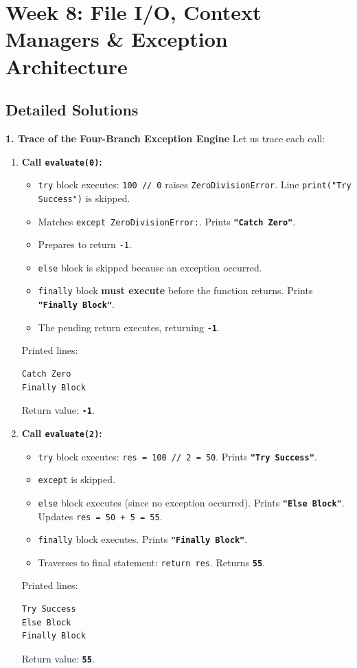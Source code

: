 \section*{Week 8: File I/O, Context Managers \& Exception Architecture}

\subsection*{Detailed Solutions}

\textbf{1. Trace of the Four-Branch Exception Engine}
Let us trace each call:
\begin{enumerate}
    \item \textbf{Call \texttt{evaluate(0)}:}
    \begin{itemize}
        \item \texttt{try} block executes: \texttt{100 // 0} raises \texttt{ZeroDivisionError}. Line \texttt{print("Try Success")} is skipped.
        \item Matches \texttt{except ZeroDivisionError:}. Prints \textbf{\texttt{"Catch Zero"}}.
        \item Prepares to return \texttt{-1}.
        \item \texttt{else} block is skipped because an exception occurred.
        \item \texttt{finally} block \textbf{must execute} before the function returns. Prints \textbf{\texttt{"Finally Block"}}.
        \item The pending return executes, returning \textbf{\texttt{-1}}.
    \end{itemize}
    Printed lines:
    \begin{lstlisting}
Catch Zero
Finally Block
    \end{lstlisting}
    Return value: \textbf{\texttt{-1}}.

    \item \textbf{Call \texttt{evaluate(2)}:}
    \begin{itemize}
        \item \texttt{try} block executes: \texttt{res = 100 // 2 = 50}. Prints \textbf{\texttt{"Try Success"}}.
        \item \texttt{except} is skipped.
        \item \texttt{else} block executes (since no exception occurred). Prints \textbf{\texttt{"Else Block"}}. Updates \texttt{res = 50 + 5 = 55}.
        \item \texttt{finally} block executes. Prints \textbf{\texttt{"Finally Block"}}.
        \item Traverses to final statement: \texttt{return res}. Returns \textbf{\texttt{55}}.
    \end{itemize}
    Printed lines:
    \begin{lstlisting}
Try Success
Else Block
Finally Block
    \end{lstlisting}
    Return value: \textbf{\texttt{55}}.
\end{enumerate}

